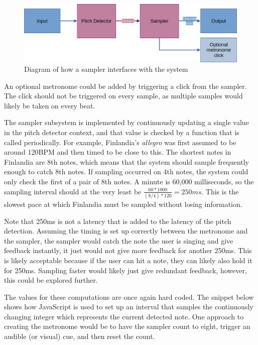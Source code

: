 \begin{figure}[ht]
    \centering
    \includegraphics[width=\textwidth]{./images/samplerArch.png}
    \caption{Diagram of how a sampler interfaces with the system\label{fig:samplerArch}}
\end{figure}

An optional metronome could be added by triggering a click from the sampler. The click should not be triggered on every sample, as multiple samples would likely be taken on every beat. 

The sampler subsystem is implemented by continuously updating a single value in the pitch detector context, and that value is checked by a function that is called periodically. For example, Finlandia's \textit{allegro} was first assumed to be around 120BPM and then timed to be close to this. The shortest notes in Finlandia are 8th notes, which means that the system should sample frequently enough to catch 8th notes. If sampling occurred on 4th notes, the system could only check the first of a pair of 8th notes. A minute is 60,000 milliseconds, so the sampling interval should at the very least be $\frac{60*1000}{(8/4)*120} = 250ms$. This is the slowest pace at which Finlandia must be sampled without losing information.

Note that 250ms is not a latency that is added to the latency of the pitch detection. Assuming the timing is set up correctly between the metronome and the sampler, the sampler would catch the note the user is singing and give feedback instantly, it just would not give more feedback for another 250ms. This is likely acceptable because if the user can hit a note, they can likely also hold it for 250ms. Sampling faster would likely just give redundant feedback, however, this could be explored further. 

The values for these computations are once again hard coded. The snippet below shows how JavaScript is used to set up an interval that samples the continuously changing integer which represents the current detected note.  One approach to creating the metronome would be to have the sampler count to eight, trigger an audible (or visual) cue, and then reset the count.



